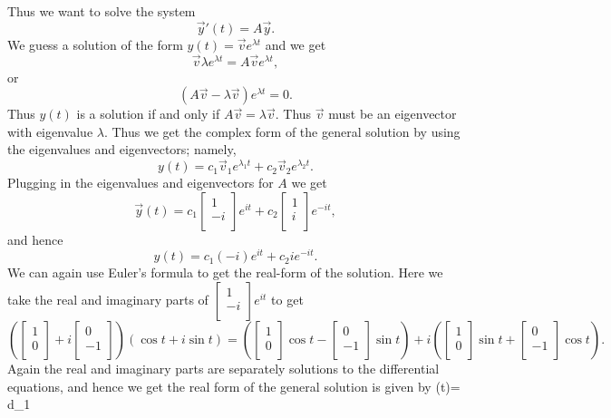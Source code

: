 \documentclass[12pt,letterpaper]{article}
\begin{document}
\begin{enumerate}
Thus we want to solve the system $$\vec{y}\prime(t)= A \vec{y}.$$ We guess a solution of the form $y(t)= \vec{v} e^{\lambda t}$ and we get $$\vec{v}\lambda e^{\lambda t} = A \vec{v} e^{\lambda t},$$ or $$(A\vec{v}-\lambda \vec{v})e^{\lambda t} =0.$$ Thus $y(t)$ is a solution if and only if $A\vec{v}=\lambda \vec{v}$. Thus $\vec{v}$ must be an eigenvector with eigenvalue $\lambda$. Thus we get the complex form of the general solution by using the eigenvalues and eigenvectors; namely, $$y(t)= c_1 \vec{v}_1 e^{\lambda_1 t} + c_2 \vec{v}_2 e^{\lambda_2 t}.$$ Plugging in the eigenvalues and eigenvectors for $A$ we get $$\vec{y}(t)= c_1\begin{bmatrix} 1\\ -i\\ \end{bmatrix} e^{i t} + c_2 \begin{bmatrix} 1\\ i\\ \end{bmatrix} e^{-it},$$ and hence $$y(t)= c_1(- i) e^{it} +c_2 ie^{-it}.$$ We can again use Euler's formula to get the real-form of the solution. Here we take the real and imaginary parts of $\begin{bmatrix} 1\\ -i\\ \end{bmatrix} e^{i t}$ to get $$\left(\begin{bmatrix} 1\\ 0\\ \end{bmatrix}+i\begin{bmatrix} 0\\ -1\\ \end{bmatrix}\right)(\cos{t}+i\sin{t})= \left(\begin{bmatrix} 1\\ 0\\ \end{bmatrix} \cos{t} - \begin{bmatrix} 0\\ -1\\ \end{bmatrix} \sin{t}\right)+i \left(\begin{bmatrix} 1\\ 0\\ \end{bmatrix} \sin{t}+\begin{bmatrix} 0\\ -1\\ \end{bmatrix} \cos{t}\right).$$ Again the real and imaginary parts are separately solutions to the differential equations, and hence we get the real form of the general solution is given by $$(t)= d_1 
\end{enumerate}
\end{document}
